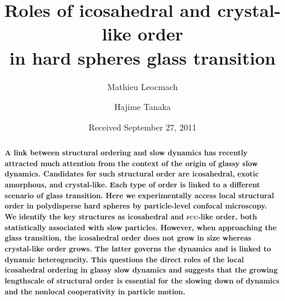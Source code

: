 

\usepackage{xr}



\title{Roles of icosahedral and crystal-like order \\ in hard spheres glass transition} 


\author{Mathieu Leocmach} 

\author{Hajime Tanaka}

\date{Received September 27, 2011}

\begin{abstract}
\textbf{
A link between structural ordering and slow dynamics has recently attracted much attention from the context of the origin of glassy slow dynamics. Candidates for such structural order are icosahedral, exotic amorphous, and crystal-like. Each type of order is linked to a different scenario of glass transition. Here we experimentally access local structural order in polydisperse hard spheres by particle-level confocal microscopy. We identify the key structures as icosahedral and \textmd{\textsc{fcc}}-like order, both statistically associated with slow particles. However, when approaching the glass transition, the icosahedral order does not grow in size whereas crystal-like order grows. The latter governs the dynamics and is linked to dynamic heterogeneity. This questions the direct roles of the local icosahedral ordering in glassy slow dynamics and suggests that the growing lengthscale of structural order is essential for the slowing down of dynamics and the nonlocal cooperativity in particle motion. 
}
\end{abstract}
\maketitle


